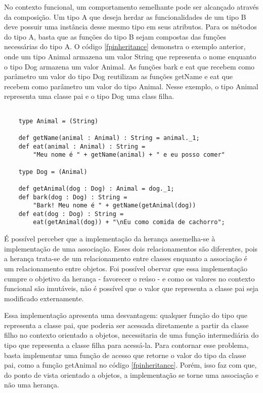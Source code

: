 No contexto funcional, um comportamento semelhante 
pode ser alcançado através da composição. Um tipo A 
que deseja herdar as funcionalidades de um tipo B 
deve possuir uma instância desse mesmo tipo em seus 
atributos. Para os métodos do tipo A, basta que as 
funções do tipo B sejam compostas das funções 
necessárias do tipo A. O código \ref{fpinheritance} 
demonstra o exemplo anterior, onde um tipo Animal 
armazena um valor String que representa o nome 
enquanto o tipo Dog armazena um valor Animal. 
As funções bark e eat que recebem como parâmetro 
um valor do tipo Dog reutilizam as funções getName 
e eat que recebem como parâmetro um valor do tipo 
Animal. Nesse exemplo, o tipo Animal representa 
uma classe pai e o tipo Dog uma class filha.

\begin{lstlisting}[caption={Herança em Programação Funcional},label=fpinheritance]
    
    type Animal = (String)

    def getName(animal : Animal) : String = animal._1;
    def eat(animal : Animal) : String = 
        "Meu nome é " + getName(animal) + " e eu posso comer"

    type Dog = (Animal)

    def getAnimal(dog : Dog) : Animal = dog._1;
    def bark(dog : Dog) : String = 
        "Bark! Meu nome é " + getName(getAnimal(dog))
    def eat(dog : Dog) : String = 
        eat(getAnimal(dog)) + "\nEu como comida de cachorro";

\end{lstlisting}

É possível perceber que a implementação da herança 
assemelha-se à implementação de uma associação. 
Esses dois relacionamentos são diferentes, pois a 
herança trata-se de um relacionamento entre 
classes enquanto a associação é um relacionamento 
entre objetos\cite{umlsystems}. Foi possível 
obervar que essa implementação cumpre o objetivo 
da herança - favorecer o reúso - e como os valores 
no contexto funcional são imutáveis, não é possível 
que o valor que representa a classe pai seja 
modificado externamente.

Essa implementação apresenta uma desvantagem: 
qualquer função do tipo que representa 
a classe pai, que poderia ser acessada 
diretamente a partir da classe filho 
no contexto orientado a objetos, 
necessitaria de uma função intermediária 
do tipo que representa a classe filha 
para acessá-la. Para contornar esse 
problema, basta implementar uma função 
de acesso que retorne o valor do tipo 
da classe pai, como a função getAnimal 
no código \ref{fpinheritance}. Porém, isso 
faz com que, do ponto de vista orientado a 
objetos, a implementação se torne uma 
associação e não uma herança. 